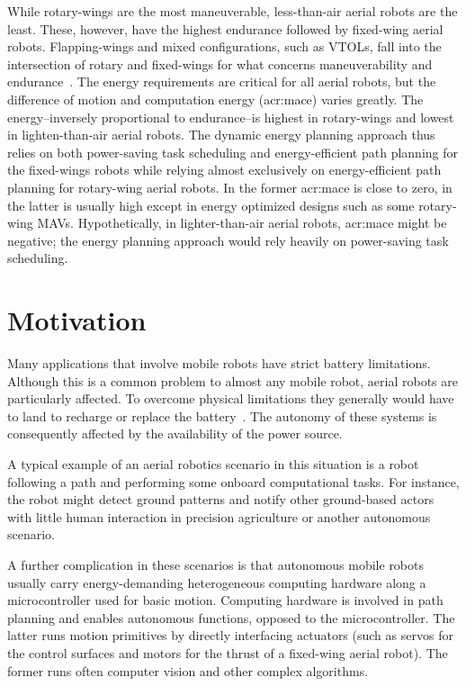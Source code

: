 While rotary-wings are the most maneuverable, less-than-air aerial robots are the least. These, however, have the highest endurance followed by fixed-wing aerial robots. Flapping-wings and mixed configurations, such as VTOLs, fall into the intersection of rotary and fixed-wings for what concerns maneuverability and endurance~\citep{siciliano2016springer}. The energy requirements are critical for all aerial robots, but the difference of motion and computation energy (\Gls{acr:mace}) varies greatly. The energy--inversely proportional to endurance--is highest in rotary-wings and lowest in lighten-than-air aerial robots. The dynamic energy planning approach thus relies on both power-saving task scheduling and energy-efficient path planning for the fixed-wings robots while relying almost exclusively on energy-efficient path planning for rotary-wing aerial robots. In the former \Gls{acr:mace} is close to zero, in the latter is usually high except in energy optimized designs such as some rotary-wing MAVs. Hypothetically, in lighter-than-air aerial robots, \Gls{acr:mace} might be negative; the energy planning approach would rely heavily on power-saving task scheduling.


\section{Motivation}
\label{sec:motivation}

Many applications that involve mobile robots have strict battery limitations. Although this is a common problem to almost any mobile robot, aerial robots are particularly affected. To overcome physical limitations they generally would have to land to recharge or replace the battery~\citep{zamanakos2020energy}. The autonomy of these systems is consequently affected by the availability of the power source. 

A typical example of an aerial robotics scenario in this situation is a robot following a path and performing some onboard computational tasks. For instance, the robot might detect ground patterns and notify other ground-based actors with little human interaction in precision agriculture or another autonomous scenario.

A further complication in these scenarios is that autonomous mobile robots usually carry energy-demanding heterogeneous computing hardware along a microcontroller used for basic motion. Computing hardware is involved in path planning and enables autonomous functions, opposed to the microcontroller. The latter runs motion primitives by directly interfacing actuators (such as servos for the control surfaces and motors for the thrust of a fixed-wing aerial robot). The former runs often computer vision and other complex algorithms.

